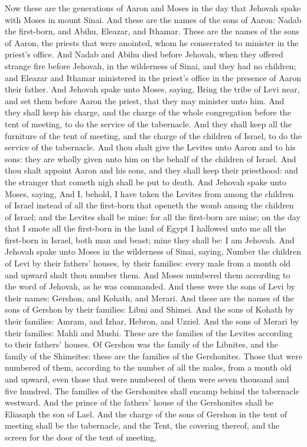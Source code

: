 Now these are the generations of Aaron and Moses in the day that Jehovah spake with Moses in mount Sinai. And these are the names of the sons of Aaron: Nadab the first-born, and Abihu, Eleazar, and Ithamar. These are the names of the sons of Aaron, the priests that were anointed, whom he consecrated to minister in the priest’s office. And Nadab and Abihu died before Jehovah, when they offered strange fire before Jehovah, in the wilderness of Sinai, and they had no children; and Eleazar and Ithamar ministered in the priest’s office in the presence of Aaron their father.  And Jehovah spake unto Moses, saying, Bring the tribe of Levi near, and set them before Aaron the priest, that they may minister unto him. And they shall keep his charge, and the charge of the whole congregation before the tent of meeting, to do the service of the tabernacle. And they shall keep all the furniture of the tent of meeting, and the charge of the children of Israel, to do the service of the tabernacle. And thou shalt give the Levites unto Aaron and to his sons: they are wholly given unto him on the behalf of the children of Israel. And thou shalt appoint Aaron and his sons, and they shall keep their priesthood: and the stranger that cometh nigh shall be put to death.  And Jehovah spake unto Moses, saying, And I, behold, I have taken the Levites from among the children of Israel instead of all the first-born that openeth the womb among the children of Israel; and the Levites shall be mine: for all the first-born are mine; on the day that I smote all the first-born in the land of Egypt I hallowed unto me all the first-born in Israel, both man and beast; mine they shall be: I am Jehovah.  And Jehovah spake unto Moses in the wilderness of Sinai, saying, Number the children of Levi by their fathers’ houses, by their families: every male from a month old and upward shalt thou number them. And Moses numbered them according to the word of Jehovah, as he was commanded. And these were the sons of Levi by their names: Gershon, and Kohath, and Merari. And these are the names of the sons of Gershon by their families: Libni and Shimei. And the sons of Kohath by their families: Amram, and Izhar, Hebron, and Uzziel. And the sons of Merari by their families: Mahli and Mushi. These are the families of the Levites according to their fathers’ houses.  Of Gershon was the family of the Libnites, and the family of the Shimeites: these are the families of the Gershonites. Those that were numbered of them, according to the number of all the males, from a month old and upward, even those that were numbered of them were seven thousand and five hundred. The families of the Gershonites shall encamp behind the tabernacle westward. And the prince of the fathers’ house of the Gershonites shall be Eliasaph the son of Lael. And the charge of the sons of Gershon in the tent of meeting shall be the tabernacle, and the Tent, the covering thereof, and the screen for the door of the tent of meeting, 